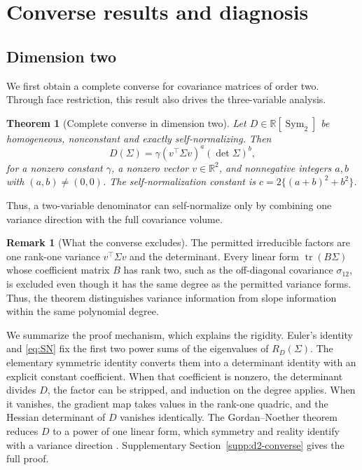\documentclass[12pt,a4paper]{article}
\theoremstyle{plain}
\newtheorem{theorem}{Theorem}
\theoremstyle{definition}
\newtheorem{remark}{Remark}
\newcommand{\R}{\mathbb{R}}
\newcommand{\Sym}{\operatorname{Sym}}
\newcommand{\tr}{\operatorname{tr}}
\begin{document}
\section{Converse results and diagnosis}
\label{sec:converse}

\subsection{Dimension two}

We first obtain a complete converse for covariance matrices of order two.
Through face restriction, this result also drives the three-variable analysis.

\begin{theorem}[Complete converse in dimension two]
\label{thm:d2}
    Let $D\in\R[\Sym_2]$ be homogeneous, nonconstant and exactly self-normalizing.
    Then
    \begin{equation}
    \label{eq:d2-form}
        D(\Sigma)
        =
        \gamma(v^\top\Sigma v)^a(\det\Sigma)^b
        ,
    \end{equation}
    for a nonzero constant $\gamma$, a nonzero vector $v\in\R^2$, and nonnegative integers $a,b$ with $(a,b)\ne(0,0)$.
    The self-normalization constant is $c=2\{(a+b)^2+b^2\}$.
\end{theorem}
Thus, a two-variable denominator can self-normalize only by combining one variance direction with the full covariance volume.

\begin{remark}[What the converse excludes]
\label{rem:d2-excludes}
    The permitted irreducible factors are one rank-one variance $v^\top\Sigma v$ and the determinant.
    Every linear form $\tr(B\Sigma)$ whose coefficient matrix $B$ has rank two, such as the off-diagonal covariance $\sigma_{12}$, is excluded even though it has the same degree as the permitted variance forms.
    Thus, the theorem distinguishes variance information from slope information within the same polynomial degree.
\end{remark}

We summarize the proof mechanism, which explains the rigidity.
Euler's identity and \eqref{eq:SN} fix the first two power sums of the eigenvalues of $R_D(\Sigma)$.
The elementary symmetric identity converts them into a determinant identity with an explicit constant coefficient.
When that coefficient is nonzero, the determinant divides $D$, the factor can be stripped, and induction on the degree applies.
When it vanishes, the gradient map takes values in the rank-one quadric, and the Hessian determinant of $D$ vanishes identically.
The Gordan--Noether theorem reduces $D$ to a power of one linear form, which symmetry and reality identify with a variance direction \citep{gordannoether1876,lossen2004}.
Supplementary Section~\ref{supp:d2-converse} gives the full proof.
\end{document}
